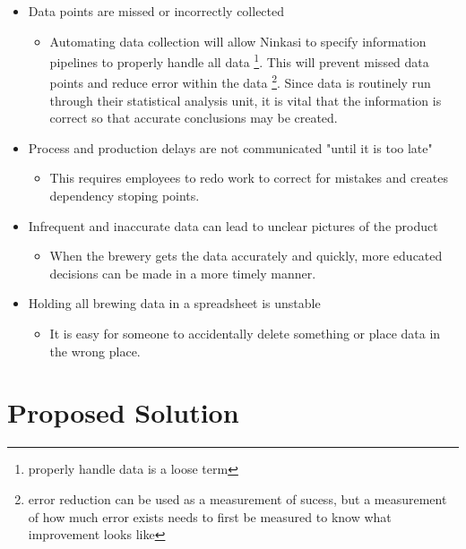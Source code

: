 \documentclass[draftclsnofoot,onecolumn,letterpaper,10pt]{IEEEtran}
\begin{document}
\begin{itemize}
	\item {Data points are missed or incorrectly collected}
      		\begin{itemize}
			\item {Automating data collection will allow Ninkasi to specify information pipelines to properly handle all data \footnote{properly handle data is a loose term}. This will prevent missed data points and reduce error within the data \footnote{error reduction can be used as a measurement of sucess, but a measurement of how much error exists needs to first be measured to know what improvement looks like}. Since data is routinely run through their statistical analysis unit, it is vital that the information is correct so that accurate conclusions may be created.}
      		\end{itemize}

	\item {Process and production delays are not communicated "until it is too late"}
			\begin{itemize}
			\item {This requires employees to redo work to correct for mistakes and creates dependency stoping points.}
			\end{itemize}

		\item {Infrequent and inaccurate data can lead to unclear pictures of the product}
			\begin{itemize}
			\item {When the brewery gets the data accurately and quickly, more educated decisions can be made in a more timely manner.}
			\end{itemize}

			\item {Holding all brewing data in a spreadsheet is unstable}
				\begin{itemize}
				\item {It is easy for someone to accidentally delete something or place data in the wrong place.}
				\end{itemize}

	\end{itemize}


\section{\textbf{Proposed Solution}}
\end{document}

